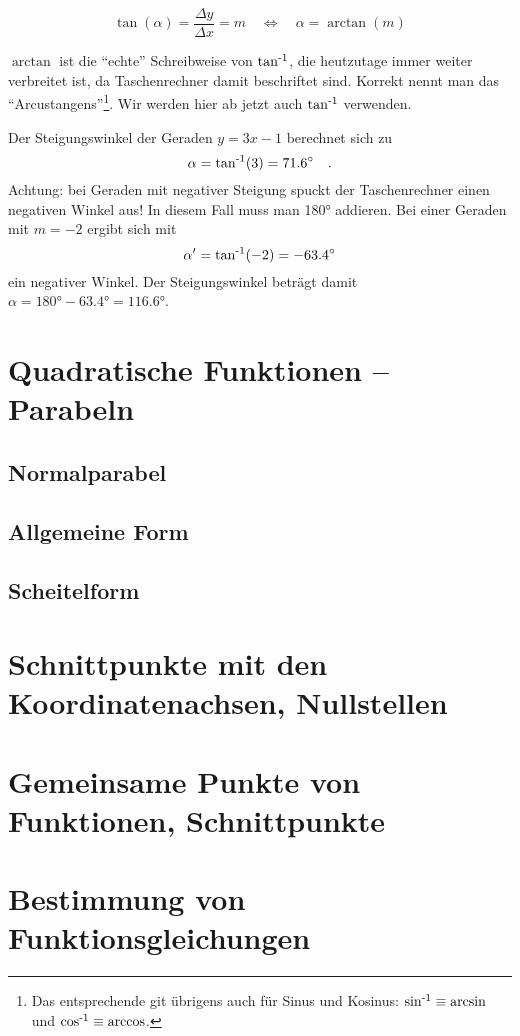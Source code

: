 \documentclass{arbeitsblatt}
\begin{document}
\begin{equation}
  \label{eq:steigungswinkel}
  \tan(\alpha) = \frac{\Delta y}{\Delta x} = m
  \quad \Leftrightarrow \quad
  \alpha = \arctan(m)
\end{equation}

$\arctan$ ist die "`echte"' Schreibweise von $\operatorname{tan^{-1}}$, die heutzutage immer
weiter verbreitet ist, da Taschenrechner damit beschriftet sind.  Korrekt
nennt man das "`Arcustangens"'\footnote{Das entsprechende git übrigens auch
  für Sinus und Kosinus: $\operatorname{sin^{-1}}\equiv\arcsin$ und $\operatorname{cos^{-1}}\equiv\arccos$.}.  Wir
werden hier ab jetzt auch $\operatorname{tan^{-1}}$ verwenden.

\begin{beispiel}\label{bsp:steigungswinkel}
  Der Steigungswinkel der Geraden $y=3x-1$ berechnet sich zu
  \begin{equation*}
    \alpha = \operatorname{tan^{-1}}(3) = \ang{71.6} \quad.
  \end{equation*}
  Achtung: bei Geraden mit negativer Steigung spuckt der Taschenrechner einen
  negativen Winkel aus!  In diesem Fall muss man \ang{180} addieren.  Bei
  einer Geraden mit $m=-2$ ergibt sich mit
  \begin{equation*}
    \alpha' = \operatorname{tan^{-1}}(-2) = \ang{-63.4}
  \end{equation*}
  ein negativer Winkel.  Der Steigungswinkel beträgt damit $\alpha=\ang{180} -
  \ang{63.4} = \ang{116.6}$.
\end{beispiel}

\section{Quadratische Funktionen -- Parabeln}\label{sec:quadr-funkt-parab}
\subsection{Normalparabel}

\subsection{Allgemeine Form}

\subsection{Scheitelform}

\section{Schnittpunkte mit den Koordinatenachsen, Nullstellen}

\section{Gemeinsame Punkte von Funktionen, Schnittpunkte}

\section{Bestimmung von Funktionsgleichungen}

\printacronyms
\end{document}
